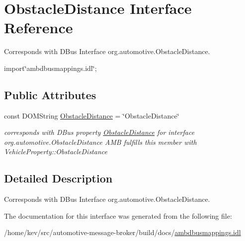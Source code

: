 \hypertarget{interfaceObstacleDistance}{\section{Obstacle\+Distance Interface Reference}
\label{interfaceObstacleDistance}
}


Corresponds with D\+Bus Interface org.\+automotive.\+Obstacle\+Distance.  




{\ttfamily import\char`\"{}ambdbusmappings.\+idl\char`\"{};}

\subsection*{Public Attributes}
\begin{DoxyCompactItemize}
\item 
\hypertarget{interfaceObstacleDistance_af20a13bd24843a62ef97c4d36b7ee466}{const D\+O\+M\+String \hyperlink{interfaceObstacleDistance_af20a13bd24843a62ef97c4d36b7ee466}{Obstacle\+Distance} = \char`\"{}Obstacle\+Distance\char`\"{}}\label{interfaceObstacleDistance_af20a13bd24843a62ef97c4d36b7ee466}

\begin{DoxyCompactList}\small\item\em corresponds with D\+Bus property \hyperlink{interfaceObstacleDistance}{Obstacle\+Distance} for interface org.\+automotive.\+Obstacle\+Distance A\+M\+B fulfills this member with Vehicle\+Property\+::\+Obstacle\+Distance \end{DoxyCompactList}\end{DoxyCompactItemize}


\subsection{Detailed Description}
Corresponds with D\+Bus Interface org.\+automotive.\+Obstacle\+Distance. 

The documentation for this interface was generated from the following file\+:\begin{DoxyCompactItemize}
\item 
/home/kev/src/automotive-\/message-\/broker/build/docs/\hyperlink{ambdbusmappings_8idl}{ambdbusmappings.\+idl}\end{DoxyCompactItemize}
